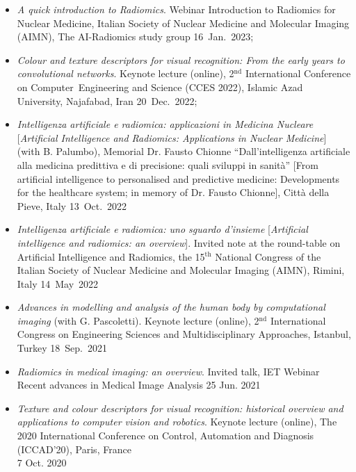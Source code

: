 \documentclass[11pt]{article}
\begin{document}
\begin{itemize}
\item \emph{A quick introduction to Radiomics}. Webinar Introduction to Radiomics for Nuclear Medicine, Italian Society of Nuclear Medicine and Molecular Imaging (AIMN), The AI-Radiomics study group \hfill 16~Jan.~2023;

\item \emph{Colour and texture descriptors for visual recognition: From the early years to convolutional networks}. Keynote lecture (online), 2$^\text{nd}$ International Conference on Computer Engineering and Science (CCES 2022), Islamic Azad University, Najafabad, Iran \hfill 20~Dec.~2022;

\item \emph{Intelligenza artificiale e radiomica: applicazioni in Medicina Nucleare} [\emph{Artificial Intelligence and Radiomics: Applications in Nuclear Medicine}] (with B. Palumbo), Memorial Dr. Fausto Chionne ``Dall'intelligenza artificiale alla medicina predittiva e di precisione: quali sviluppi in sanità'' [From artificial intelligence to personalised and predictive medicine: Developments for the healthcare system; in memory of Dr. Fausto Chionne], Città della Pieve, Italy \hfill 13~Oct.~2022

\item \emph{Intelligenza artificiale e radiomica: uno sguardo d'insieme} [\emph{Artificial intelligence and radiomics: an overview}]. Invited note at the round-table on Artificial Intelligence and Radiomics, the 15$^\text{th}$ National Congress of the Italian Society of Nuclear Medicine and Molecular Imaging (AIMN), Rimini, Italy \hfill 14~May~2022

\item \emph{Advances in modelling and analysis of the human body by computational imaging} (with G. Pascoletti). Keynote lecture (online), 2$^\text{nd}$ International Congress on Engineering Sciences and Multidisciplinary Approaches, Istanbul, Turkey \hfill 18~Sep.~2021

\item \emph{Radiomics in medical imaging: an overview}. Invited talk, IET Webinar Recent advances in Medical Image Analysis \hfill 25 Jun. 2021

\item \emph{Texture and colour descriptors for visual recognition: historical overview and applications to computer vision and robotics}. Keynote lecture (online), The 2020 International Conference on Control, Automation and Diagnosis (ICCAD’20), Paris, France \\ \mbox{} \hfill 7 Oct. 2020


\end{itemize}
\end{document}
